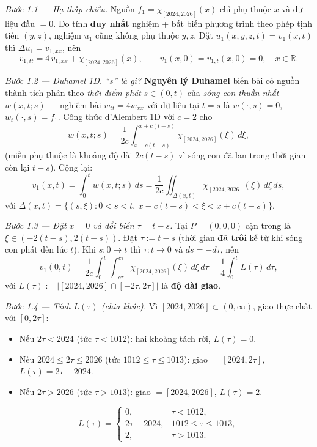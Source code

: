 \emph{Bước 1.1 --- Hạ thấp chiều.} Nguồn $f_1=\chi_{[2024,2026]}(x)$ chỉ phụ thuộc $x$ và dữ liệu đầu $=0$. Do tính \textbf{duy nhất} nghiệm + bất biến phương trình theo phép tịnh tiến $(y,z)$, nghiệm $u_1$ cũng không phụ thuộc $y,z$. Đặt $u_1(x,y,z,t)=v_1(x,t)$ thì $\Delta u_1=v_{1,xx}$, nên
\[
  v_{1,tt}=4\,v_{1,xx}+\chi_{[2024,2026]}(x),\qquad v_1(x,0)=v_{1,t}(x,0)=0,\quad x\in\mathbb{R}.
\]

\emph{Bước 1.2 --- Duhamel 1D. ``$s$'' là gì?} \textbf{Nguyên lý Duhamel} biến bài có nguồn thành tích phân theo \emph{thời điểm phát} $s\in(0,t)$ của \emph{sóng con thuần nhất} $w(x,t;s)$ — nghiệm bài $w_{tt}=4w_{xx}$ với dữ liệu tại $t=s$ là $w(\cdot,s)=0$, $w_t(\cdot,s)=f_1$. Công thức d'Alembert 1D với $c=2$ cho
\[
  w(x,t;s)=\frac{1}{2c}\int_{x-c(t-s)}^{x+c(t-s)}\!\chi_{[2024,2026]}(\xi)\,d\xi,
\]
(miền phụ thuộc là khoảng độ dài $2c(t-s)$ vì sóng con đã lan trong thời gian còn lại $t-s$). Cộng lại:
\[
  v_1(x,t)=\int_0^t w(x,t;s)\,ds
  =\frac{1}{2c}\iint_{\Delta(x,t)}\!\chi_{[2024,2026]}(\xi)\,d\xi\,ds,
\]
với $\Delta(x,t)=\{(s,\xi):0<s<t,\ x-c(t-s)<\xi<x+c(t-s)\}$.

\emph{Bước 1.3 --- Đặt $x=0$ và đổi biến $\tau=t-s$.} Tại $P=(0,0,0)$ cận trong là $\xi\in(-2(t-s),2(t-s))$. Đặt $\tau:=t-s$ (thời gian \textbf{đã trôi} kể từ khi sóng con phát đến lúc $t$). Khi $s:0\to t$ thì $\tau:t\to0$ và $ds=-d\tau$, nên
\[
  v_1(0,t)=\frac{1}{2c}\int_0^t\!\!\int_{-c\tau}^{c\tau}\!\chi_{[2024,2026]}(\xi)\,d\xi\,d\tau
  =\frac{1}{4}\int_0^t L(\tau)\,d\tau,
\]
với $L(\tau):=\big|[2024,2026]\cap[-2\tau,2\tau]\big|$ là \textbf{độ dài giao}.

\emph{Bước 1.4 --- Tính $L(\tau)$ (chia khúc).} Vì $[2024,2026]\subset(0,\infty)$, giao thực chất với $[0,2\tau]$:
\begin{itemize}
\item Nếu $2\tau<2024$ (tức $\tau<1012$): hai khoảng tách rời, $L(\tau)=0$.
\item Nếu $2024\le2\tau\le2026$ (tức $1012\le\tau\le1013$): giao $=[2024,2\tau]$, $L(\tau)=2\tau-2024$.
\item Nếu $2\tau>2026$ (tức $\tau>1013$): giao $=[2024,2026]$, $L(\tau)=2$.
\end{itemize}
\[
  L(\tau)=\begin{cases}0,&\tau<1012,\\ 2\tau-2024,&1012\le\tau\le1013,\\ 2,&\tau>1013.\end{cases}
\]

